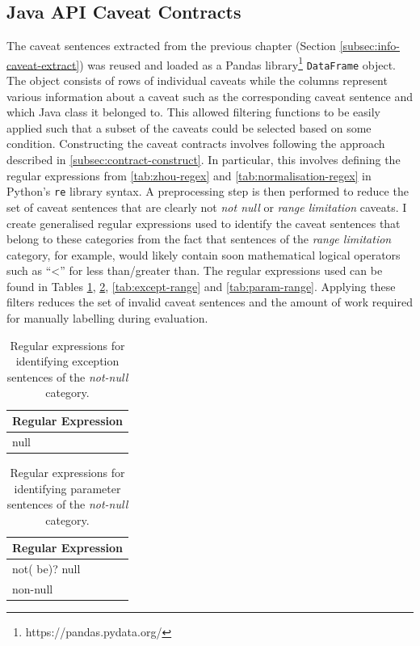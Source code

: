 \subsection{Java API Caveat Contracts}
\label{subsec:contract-caveat-contracts}
The caveat sentences extracted from the previous chapter (Section \ref{subsec:info-caveat-extract}) was reused and loaded as a Pandas library\footnote{https://pandas.pydata.org/} \lstinline{DataFrame} object. The object consists of rows of individual caveats while the columns represent various information about a caveat such as the corresponding caveat sentence and which Java class it belonged to. This allowed filtering functions to be easily applied such that a subset of the caveats could be selected based on some condition. Constructing the caveat contracts involves following the approach described in \ref{subsec:contract-construct}. In particular, this involves defining the regular expressions from \ref{tab:zhou-regex} and \ref{tab:normalisation-regex} in Python's \lstinline{re} library syntax. A preprocessing step is then performed to reduce the set of caveat sentences that are clearly not \textit{not null} or \textit{range limitation} caveats. I create generalised regular expressions used to identify the caveat sentences that belong to these categories from the fact that sentences of the \textit{range limitation} category, for example, would likely contain soon mathematical logical operators such as ``<'' for less than/greater than. The regular expressions used can be found in Tables \ref{tab:except-null}, \ref{tab:param-null}, \ref{tab:except-range} and \ref{tab:param-range}. Applying these filters reduces the set of invalid caveat sentences and the amount of work required for manually labelling during evaluation.\bigbreak

\begin{table}[h]
	\centering
	\begin{tabular}{|l|}
		\hline
		\textbf{Regular Expression} \\ \hline
		null \\ \hline
	\end{tabular}
	\caption{Regular expressions for identifying exception sentences of the \textit{not-null} category.}
	\label{tab:except-null}
\end{table}

\begin{table}[h]
	\centering
	\begin{tabular}{|l|}
		\hline
		\textbf{Regular Expression} \\ \hline
		not( be)? null \\ \hline
		non-null \\ \hline
	\end{tabular}
	\caption{Regular expressions for identifying parameter sentences of the \textit{not-null} category.}
	\label{tab:param-null}
\end{table}

